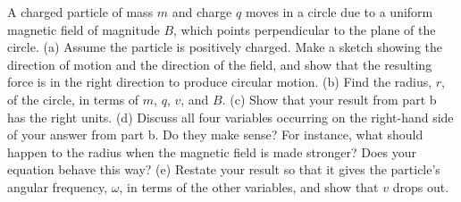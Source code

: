 A charged particle of mass $m$ and charge $q$
        moves in a circle due to a uniform magnetic field of magnitude $B$,
        which points perpendicular to the plane of the circle.\hwendpart
        (a) Assume the particle is positively charged.
        Make a sketch showing the direction of motion and the direction of the
        field, and show that the resulting force is in the right direction to
        produce circular motion.\hwendpart
        (b) Find the radius, $r$, of the circle, in terms of $m$, $q$,
         $v$, and $B$.\answercheck\hwendpart
        (c) Show that your result from part b has the right units.\hwendpart
        (d) Discuss all four variables occurring on the right-hand side of your
        answer from part b. Do they make sense? For instance, what should happen
        to the radius when the magnetic field is made stronger? Does your equation behave
        this way?\hwendpart
        (e) Restate your result so that it gives the particle's angular frequency,
        $\omega$, in terms of the other variables, and show that $v$ drops out.\answercheck\hwendpart
